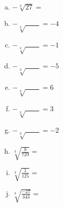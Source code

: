 \documentclass[a4paper,14pt]{article}
\begin{document}
\begin{multicols}{2}
\begin{enumerate}
\begin{enumerate}[a)]
        	\item $-\sqrt[3]{27} = $
        	\item $-\sqrt[3]{~~~~~~~~~} = -4$
        	\item $-\sqrt[3]{~~~~~~~~~} = -1$
        	\item $-\sqrt[3]{~~~~~~~~~} = -5$
        	\item $-\sqrt[3]{~~~~~~~~~} = 6$
        	\item $-\sqrt[3]{~~~~~~~~~} = 3$
        	\item $-\sqrt[3]{~~~~~~~~~} = -2$
        	\item $\sqrt[3]{\frac{8}{729}} = $
        	\item $\sqrt[3]{\frac{1}{125}} = $
        	\item $\sqrt[3]{\frac{-27}{343}} = $
        	
        	
        \end{enumerate}
		
		
    \end{enumerate}        
    \end{multicols}    
\end{document}
